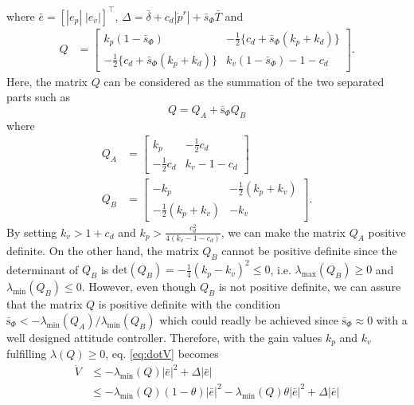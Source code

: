\documentclass[letterpaper, 10 pt, conference]{ieeeconf}  %
\begin{document}
where $\bar{e} = [|e_p|\;|e_v|]^\top$, $\Delta = \bar{\delta}+c_d|\dot{p}^r|+\bar{s}_\Phi\bar{T}$ and
\begin{align}
Q &= \left[
\begin{array}{rr}
k_p(1-\bar{s}_\Phi) & -\frac{1}{2}\{c_d+\bar{s}_\Phi(k_p+k_d)\} \\
-\frac{1}{2}\{c_d+\bar{s}_\Phi(k_p+k_d)\} & k_v(1-\bar{s}_\Phi)-1-c_d
\end{array}
\right].\nonumber 
\end{align}
Here, the matrix $Q$ can be considered as the summation of the two separated parts such as
\begin{equation}
Q = Q_A + \bar{\text{s}}_\Phi Q_B \nonumber
\end{equation}
where
\begin{align}
Q_A &= \left[
\begin{array}{rr}
k_p & -\frac{1}{2}c_d \\ -\frac{1}{2}c_d & k_v-1-c_d
\end{array}
\right] \nonumber \\
Q_B &= \left[
\begin{array}{rr}
-k_p & -\frac{1}{2}(k_p+k_v) \\ -\frac{1}{2}(k_p+k_v) & -k_v
\end{array}
\right].
\end{align}
By setting $k_v > 1+c_d$ and $k_p > \frac{c_d^2}{4(k_v-1-c_d)}$, we can make the matrix $Q_A$ positive definite. 
On the other hand, the matrix $Q_B$ cannot be positive definite since the determinant of $Q_B$ is $\text{det}(Q_B) = -\frac{1}{4}(k_p-k_v)^2 \leq 0$, i.e. $\lambda_{\max}(Q_B)\geq0$ and $\lambda_{\min}(Q_B)\leq 0$.
However, even though $Q_B$ is not positive definite, we can assure that the matrix $Q$ is positive definite with the condition $\bar{\text{s}}_\Phi < -\lambda_{\min}(Q_A)/\lambda_{\min}(Q_B)$
which could readly be achieved since $\bar{\text{s}}_\Phi \approx 0$ with a well designed attitude controller.
Therefore, with the gain values $k_p$ and $k_v$ fulfilling $\lambda(Q) \geq 0$, eq. \eqref{eq:dotV} becomes
\begin{align}
\dot{V} &\leq -\lambda_{\min}(Q)|\bar{e}|^2 + \Delta|\bar{e}| \nonumber \\
&\leq -\lambda_{\min}(Q)(1-\theta)|\bar{e}|^2-\lambda_{\min}(Q)\theta|\bar{e}|^2 + \Delta|\bar{e}| \nonumber
\end{align}
\end{document}
